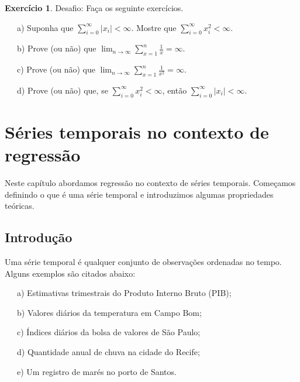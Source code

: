 \documentclass[
]{book}
\theoremstyle{definition}
\theoremstyle{definition}
\theoremstyle{definition}
\newtheorem{exercise}{Exercício}[chapter]
\theoremstyle{remark}
\begin{document}
\begin{exercise}
\protect\hypertarget{exr:exerint8}{}{\label{exr:exerint8} }Desafio: Faça os seguinte exercícios.

~~~a) Suponha que \(\sum_{i=0}^{\infty}|x_i|<\infty\). Mostre que \(\sum_{i=0}^{\infty}x_i^{2}<\infty\).

~~~b) Prove (ou não) que \(\lim_{n\rightarrow\infty}\sum_{x=1}^{n}\frac{1}{x}=\infty\).

~~~c) Prove (ou não) que \(\lim_{n\rightarrow\infty}\sum_{x=1}^{n}\frac{1}{x^2}=\infty\).

~~~d) Prove (ou não) que, se \(\sum_{i=0}^{\infty}x_i^2<\infty\), então \(\sum_{i=0}^{\infty}|x_i|<\infty\).
\end{exercise}

\hypertarget{streg}{%
\chapter{Séries temporais no contexto de regressão}\label{streg}}

Neste capítulo abordamos regressão no contexto de séries temporais. Começamos
definindo o que é uma série temporal e introduzimos algumas propriedades teóricas.

\hypertarget{introduuxe7uxe3o}{%
\section{Introdução}\label{introduuxe7uxe3o}}

Uma série temporal é qualquer conjunto de observações ordenadas no tempo. Alguns
exemplos são citados abaixo:

~~~a) Estimativas trimestrais do Produto Interno Bruto (PIB);

~~~b) Valores diários da temperatura em Campo Bom;

~~~c) Índices diários da bolsa de valores de São Paulo;

~~~d) Quantidade anual de chuva na cidade do Recife;

~~~e) Um registro de marés no porto de Santos.
\end{document}
